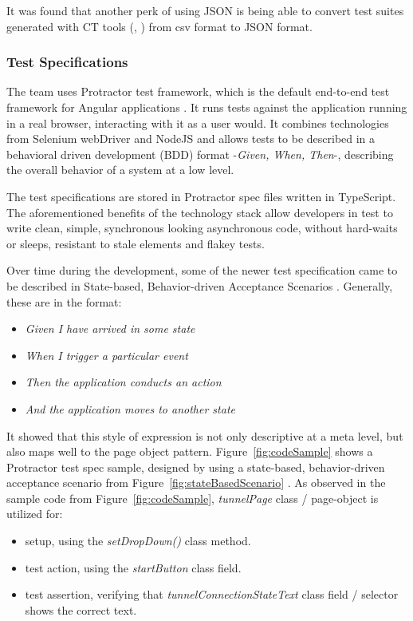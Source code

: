 \documentclass[conference]{IEEEtran}
\begin{document}
	It was found that another perk of using JSON is being able to convert test suites generated with CT tools (\cite{gargantini2018migrating}, \cite{ACTS-tool}) from csv format to JSON format.

	\subsubsection{Test Specifications}

	The team uses Protractor test framework, which is the default end-to-end test framework for Angular applications \cite{protractor}.
	It runs tests against the application running in a real browser, interacting with it as a user would.
	It combines technologies from Selenium webDriver and NodeJS and allows tests to be described in a behavioral driven development (BDD) format -\textit{Given, When, Then}-, describing the overall behavior of a system at a low level.
	
	The test specifications are stored in Protractor spec files written in TypeScript. 
	The aforementioned benefits of the technology stack allow developers in test to write clean, simple, synchronous looking asynchronous code, without hard-waits or sleeps, resistant to stale elements and flakey tests.

	Over time during the development, some of the newer test specification came to be described in State-based, Behavior-driven Acceptance Scenarios \cite{stateobjects}. 
	Generally, these are in the format:

	\begin{itemize}
		\item [] \textit{Given I have arrived in some state}
		\item [] \textit{When I trigger a particular event}
		\item [] \textit{Then the application conducts an action}
		\item [] \textit{And the application moves to another state}
	\end{itemize}
	
	It showed that this style of expression is not only descriptive at a meta level, but also maps well to the page object pattern.
	Figure~\ref{fig:codeSample} shows a Protractor test spec sample, designed by using a state-based, behavior-driven acceptance scenario from Figure~\ref{fig:stateBasedScenario} .
	As observed in the sample code from Figure~\ref{fig:codeSample}, \textit{tunnelPage} class / page-object is utilized for:
	
	\begin{itemize}
		\item setup, using the \textit{setDropDown()} class method. 
		\item test action, using the \textit{startButton} class field.
		\item test assertion, verifying that \textit{tunnelConnectionStateText} class field / selector shows the correct text.
	\end{itemize}
\end{document}
